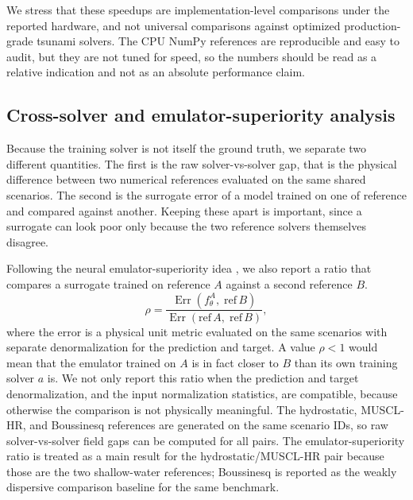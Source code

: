 We stress that these speedups are implementation-level comparisons under the reported hardware, and not universal comparisons against optimized production-grade tsunami solvers. The CPU NumPy references are reproducible and easy to audit, but they are not tuned for speed, so the numbers should be read as a relative indication and not as an absolute performance claim.

\subsection{Cross-solver and emulator-superiority analysis}
\label{subsec:cross-solver}

Because the training solver is not itself the ground truth, we separate two different quantities. The first is the raw solver-vs-solver gap, that is the physical difference between two numerical references evaluated on the same shared scenarios. The second is the surrogate error of a model trained on one of reference and compared against another. Keeping these apart is important, since a surrogate can look poor only because the two reference solvers themselves disagree.

Following the neural emulator-superiority idea \citep{koehler2026emulator}, we also report a ratio that compares a surrogate trained on reference $A$ against a second reference $B$.
\[
\rho =
\frac{\operatorname{Err}\!\left(f_\theta ^ {A},\; \mathrm{ref}\,B \right)}
     {\operatorname{Err}\!\left(\mathrm{ref}\, A,\; \mathrm{ref}\,B \right)},
\]
where the error is a physical unit metric evaluated on the same scenarios with separate denormalization for the prediction and target. A value $\rho < 1$ would mean that the emulator trained on $A$ is in fact closer to $B$ than its own training solver $a$ is. We not only report this ratio when the prediction and target denormalization, and the input normalization statistics, are compatible, because otherwise the comparison is not physically meaningful. The hydrostatic, MUSCL-HR, and Boussinesq references are generated on the same scenario IDs, so raw solver-vs-solver field gaps can be computed for all pairs. The emulator-superiority ratio is treated as a main result for the hydrostatic/MUSCL-HR pair because those are the two shallow-water references; Boussinesq is reported as the weakly dispersive comparison baseline for the same benchmark.

